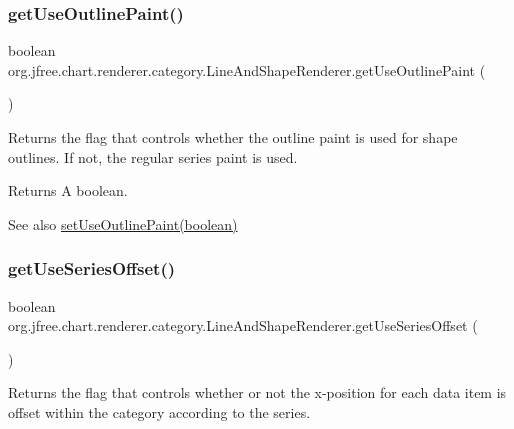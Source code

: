 \subsubsection{\texorpdfstring{get\+Use\+Outline\+Paint()}{getUseOutlinePaint()}}
{\footnotesize\ttfamily boolean org.\+jfree.\+chart.\+renderer.\+category.\+Line\+And\+Shape\+Renderer.\+get\+Use\+Outline\+Paint (\begin{DoxyParamCaption}{ }\end{DoxyParamCaption})}

Returns the flag that controls whether the outline paint is used for shape outlines. If not, the regular series paint is used.

\begin{DoxyReturn}{Returns}
A boolean.
\end{DoxyReturn}
\begin{DoxySeeAlso}{See also}
\mbox{\hyperlink{classorg_1_1jfree_1_1chart_1_1renderer_1_1category_1_1_line_and_shape_renderer_a7b6483898213a5bdbcc7c06e36ebf43d}{set\+Use\+Outline\+Paint(boolean)}} 
\end{DoxySeeAlso}
\mbox{\label{classorg_1_1jfree_1_1chart_1_1renderer_1_1category_1_1_line_and_shape_renderer_a5966e51f1ff8a604e9ec08c9700ed5ad}} 
\subsubsection{\texorpdfstring{get\+Use\+Series\+Offset()}{getUseSeriesOffset()}}
{\footnotesize\ttfamily boolean org.\+jfree.\+chart.\+renderer.\+category.\+Line\+And\+Shape\+Renderer.\+get\+Use\+Series\+Offset (\begin{DoxyParamCaption}{ }\end{DoxyParamCaption})}

Returns the flag that controls whether or not the x-\/position for each data item is offset within the category according to the series.

